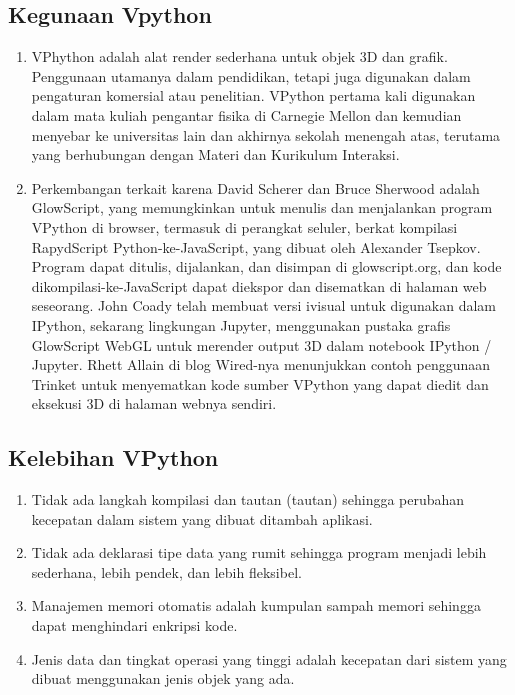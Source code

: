 \subsection{Kegunaan Vpython}
		\begin{enumerate}
			\item VPhython adalah alat render sederhana untuk objek 3D dan grafik. Penggunaan utamanya dalam pendidikan, tetapi juga digunakan dalam pengaturan komersial atau penelitian. VPython pertama kali digunakan dalam mata kuliah pengantar fisika di Carnegie Mellon dan kemudian menyebar ke universitas lain dan akhirnya sekolah menengah atas, terutama yang berhubungan dengan Materi dan Kurikulum Interaksi.
			\item Perkembangan terkait karena David Scherer dan Bruce Sherwood adalah GlowScript, yang memungkinkan untuk menulis dan menjalankan program VPython di browser, termasuk di perangkat seluler, berkat kompilasi RapydScript Python-ke-JavaScript, yang dibuat oleh Alexander Tsepkov. Program dapat ditulis, dijalankan, dan disimpan di glowscript.org, dan kode dikompilasi-ke-JavaScript dapat diekspor dan disematkan di halaman web seseorang. John Coady telah membuat versi ivisual untuk digunakan dalam IPython, sekarang lingkungan Jupyter, menggunakan pustaka grafis GlowScript WebGL untuk merender output 3D dalam notebook IPython / Jupyter. Rhett Allain di blog Wired-nya menunjukkan contoh penggunaan Trinket untuk menyematkan kode sumber VPython yang dapat diedit dan eksekusi 3D di halaman webnya sendiri.
		\end{enumerate}
\subsection{Kelebihan VPython}
		\begin{enumerate}
			\item Tidak ada langkah kompilasi dan tautan (tautan) sehingga perubahan kecepatan dalam sistem yang dibuat ditambah aplikasi.
			\item Tidak ada deklarasi tipe data yang rumit sehingga program menjadi lebih sederhana, lebih pendek, dan lebih fleksibel.
			\item Manajemen memori otomatis adalah kumpulan sampah memori sehingga dapat menghindari enkripsi kode.
			\item Jenis data dan tingkat operasi yang tinggi adalah kecepatan dari sistem yang dibuat menggunakan jenis objek yang ada.
		\end{enumerate}
